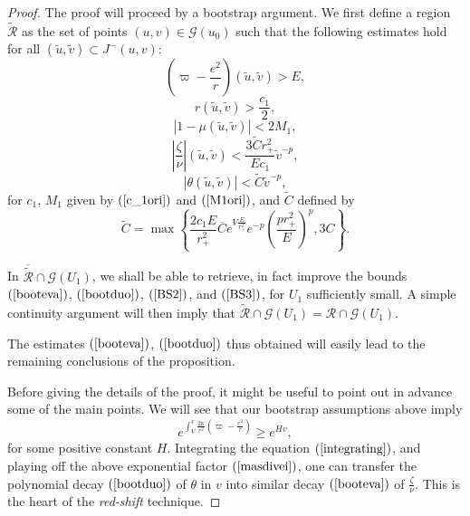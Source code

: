 \documentclass{article}
\begin{document}
{\begin{proof}
The proof will proceed by a bootstrap argument. We first define a region
$\tilde{\mathcal{R}}$ as the set of points $(u,v)\in\mathcal{G}(u_0)$ such that  
the following
estimates hold for all $(\tilde{u},\tilde{v})\subset J^-(u,v)$:
\begin{equation}
\label{BS1}
\left(\varpi-\frac{e^2}r\right)(\tilde{u},\tilde{v})>E,
\end{equation}
\begin{equation}
\label{BS2}
r(\tilde{u},\tilde{v})> \frac{c_1}2,
\end{equation}
\begin{equation}
\label{BS3}
|1-\mu(\tilde{u},\tilde{v})|<2M_1,
\end{equation}
\begin{equation}
\label{booteva}
\left|\frac\zeta\nu\right|(\tilde{u},\tilde{v})
<\frac{3\tilde{C}r_+^2}{Ec_1} \tilde{v}^{-p},
\end{equation}
\begin{equation}
\label{bootduo}
|\theta(\tilde{u},\tilde{v})|<\tilde{C}\tilde{v}^{-p},
\end{equation}
for $c_1$, $M_1$ given by  $(\ref{c_1ori})$ and $(\ref{M1ori})$,  and $\tilde{C}$
defined by
\begin{equation}
\label{miaepilogn}
\tilde{C}=\max\left\{  
\frac{2c_1E}{r_+^2}\overline{C}
e^{V\frac{E}{r_+^2}}e^{-p}\left(\frac{pr_+^2}{E}\right)^{p}
,3C \right\}.
\end{equation}

In $\overline{\tilde{\mathcal{R}}}\cap\mathcal{G}(U_1)$,
we shall be able to retrieve, in fact improve the bounds
$(\ref{booteva})$, $(\ref{bootduo})$, 
$(\ref{BS2})$, and $(\ref{BS3})$, for $U_1$ 
sufficiently small. 
A simple continuity
argument will then imply
that $\tilde{\mathcal{R}}\cap\mathcal{G}(U_1)=\mathcal{R}\cap\mathcal{G}(U_1)$.

The estimates $(\ref{booteva})$, $(\ref{bootduo})$ thus
obtained will easily
lead to the remaining conclusions of the proposition.

Before giving the details of the proof, it might be useful to
point out in advance some of the main points.
We will see that our bootstrap assumptions above imply
\begin{equation}
\label{masdivei}
e^{
\int_V^v{\frac{2\kappa}{r^2}\left(\varpi-\frac{e^2}r\right)}}
\ge e^{Hv},
\end{equation}
for some positive constant
$H$.  Integrating the equation
$(\ref{integrating})$, and playing off the above exponential factor
$(\ref{masdivei})$, one can transfer 
the polynomial decay $(\ref{bootduo})$ of $\theta$ in $v$ into similar
decay $(\ref{booteva})$ of $\frac{\zeta}{\nu}$. 
This is the heart of the \emph{red-shift} technique.


\end{proof}}
\end{document}
